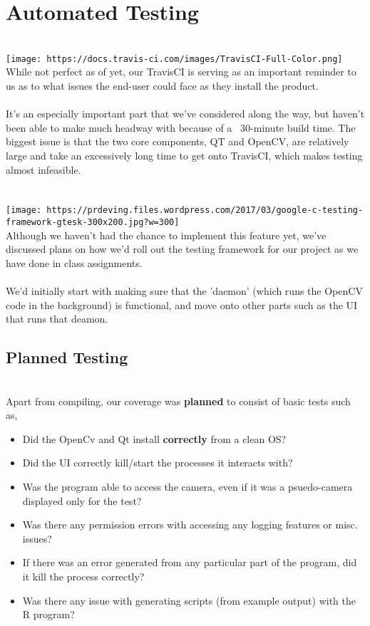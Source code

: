 \documentclass[12pt]{article}
\begin{document}
\section*{Automated Testing}
\\\texttt{[image: https://docs.travis-ci.com/images/TravisCI-Full-Color.png]}
\\
While not perfect as of yet, our TravisCI is serving as an important reminder to us as to what issues the end-user could face as they install the product. 
\\
\\It's an especially important part that we've considered along the way, but haven't been able to make much headway with because of a ~30-minute build time. The biggest issue is that the two core components, QT and OpenCV, are relatively large and take an excessively long time to get onto TravisCI, which makes testing almost infeasible.
\\
\\
\\\texttt{[image: https://prdeving.files.wordpress.com/2017/03/google-c-testing-framework-gtesk-300x200.jpg?w=300]}
\\Although we haven't had the chance to implement this feature yet, we've discussed plans on how we'd roll out the testing framework for our project as we have done in class assignments. 
\\
\\We'd initially start with making sure that the 'daemon' (which runs the OpenCV code in the background) is functional, and move onto other parts such as the UI that runs that deamon.
\pagebreak
\\\subsection*{Planned Testing}
\\Apart from compiling, our coverage was \textbf{planned} to consist of basic tests such as,
\\\begin{itemize}
  \\\item Did the OpenCv and Qt install \textbf{correctly} from a clean OS?
  \\\item Did the UI correctly kill/start the processes it interacts with?
  \\\item Was the program able to access the camera, even if it was a psuedo-camera displayed only for the test?
  \\\item Was there any permission errors with accessing any logging features or misc. issues?
  \\\item If there was an error generated from any particular part of the program, did it kill the process correctly?
  \\\item Was there any issue with generating scripts (from example output) with the R program? 
\end{itemize}
\pagebreak
\end{document}
